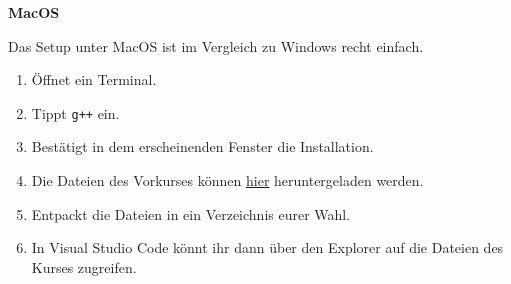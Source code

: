 \textbf{MacOS}
\label{sec:macos}

\pagestyle{empty}

Das Setup unter MacOS ist im Vergleich zu Windows recht einfach.

\begin{enumerate}
	\item Öffnet ein Terminal.
	\item Tippt \texttt{g++} ein.
	\item Bestätigt in dem erscheinenden Fenster die Installation.
	\item Die Dateien des Vorkurses können \href{https://mathphys.info/vorkurs/pvk/vorkurs.zip}{hier} heruntergeladen werden.
	\item Entpackt die Dateien in ein Verzeichnis eurer Wahl.
	\item In Visual Studio Code könnt ihr dann über den Explorer auf die Dateien des Kurses zugreifen.
\end{enumerate}